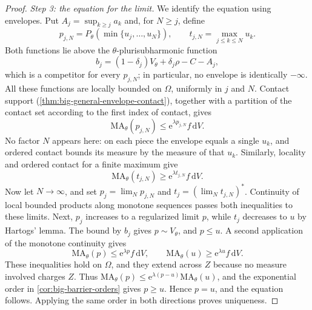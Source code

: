 \begin{proof}
\emph{Step 3: the equation for the limit.} We identify the equation using envelopes. Put $A_j=\sup_{k\geq j}a_k$ and, for $N\geq j$, define
\[
 p_{j,N}=P_\theta(\min\{u_j,\ldots,u_N\}),\qquad
 t_{j,N}=\max_{j\leq k\leq N}u_k.
\]
Both functions lie above the $\theta$-plurisubharmonic function
\[
 b_j=(1-\delta_j)V_\theta+\delta_j\rho-C-A_j,
\]
which is a competitor for every $p_{j,N}$; in particular, no envelope is identically $-\infty$. All these functions are locally bounded on $\Omega$, uniformly in $j$ and $N$. Contact support (\cref{thm:big-general-envelope-contact}), together with a partition of the contact set according to the first index of contact, gives
\[
 \mathrm{MA}_\theta(p_{j,N})\leq \mathrm{e}^{\lambda p_{j,N}}f\,\mathrm{d}V.
\]
No factor $N$ appears here: on each piece the envelope equals a single $u_k$, and ordered contact bounds its measure by the measure of that $u_k$. Similarly, locality and ordered contact for a finite maximum give
\[
 \mathrm{MA}_\theta(t_{j,N})\geq \mathrm{e}^{\lambda t_{j,N}}f\,\mathrm{d}V.
\]
Now let $N\to\infty$, and set $p_j=\lim_Np_{j,N}$ and $t_j=(\lim_Nt_{j,N})^*$. Continuity of local bounded products along monotone sequences passes both inequalities to these limits. Next, $p_j$ increases to a regularized limit $p$, while $t_j$ decreases to $u$ by Hartogs' lemma. The bound by $b_j$ gives $p\sim V_\theta$, and $p\leq u$. A second application of the monotone continuity gives
\[
 \mathrm{MA}_\theta(p)\leq \mathrm{e}^{\lambda p}f\,\mathrm{d}V,
 \qquad \mathrm{MA}_\theta(u)\geq \mathrm{e}^{\lambda u}f\,\mathrm{d}V.
\]
These inequalities hold on $\Omega$, and they extend across $Z$ because no measure involved charges $Z$. Thus $\mathrm{MA}_\theta(p)\leq \mathrm{e}^{\lambda(p-u)}\mathrm{MA}_\theta(u)$, and the exponential order in \cref{cor:big-barrier-orders} gives $p\geq u$. Hence $p=u$, and the equation follows. Applying the same order in both directions proves uniqueness.
\end{proof}

